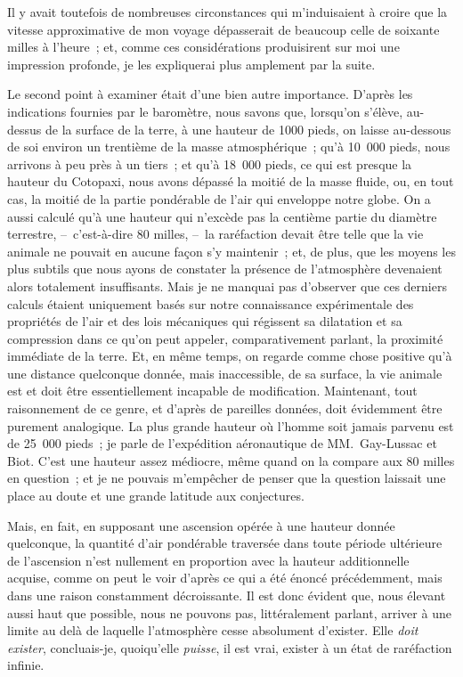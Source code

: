 \documentclass[french,twoside]{book} %
\begin{document}
Il y avait toutefois de nombreuses circonstances qui m’induisaient à croire que la vitesse approximative de mon voyage dépasserait de beaucoup celle de soixante milles à l’heure ; et, comme ces considérations produisirent sur moi une impression profonde, je les expliquerai plus amplement par la suite.\par
Le second point à examiner était d’une bien autre importance. D’après les indications fournies par le baromètre, nous savons que, lorsqu’on s’élève, au-dessus de la surface de la terre, à une hauteur de 1000 pieds, on laisse au-dessous de soi environ un trentième de la masse atmosphérique ; qu’à 10 000 pieds, nous arrivons à peu près à un tiers ; et qu’à 18 000 pieds, ce qui est presque la hauteur du Cotopaxi, nous avons dépassé la moitié de la masse fluide, ou, en tout cas, la moitié de la partie pondérable de l’air qui enveloppe notre globe. On a aussi calculé qu’à une hauteur qui n’excède pas la centième partie du diamètre terrestre, – c’est-à-dire 80 milles, – la raréfaction devait être telle que la vie animale ne pouvait en aucune façon s’y maintenir ; et, de plus, que les moyens les plus subtils que nous ayons de constater la présence de l’atmosphère devenaient alors totalement insuffisants. Mais je ne manquai pas d’observer que ces derniers calculs étaient uniquement basés sur notre connaissance expérimentale des propriétés de l’air et des lois mécaniques qui régissent sa dilatation et sa compression dans ce qu’on peut appeler, comparativement parlant, la proximité immédiate de la terre. Et, en même temps, on regarde comme chose positive qu’à une distance quelconque donnée, mais inaccessible, de sa surface, la vie animale est et doit être essentiellement incapable de modification. Maintenant, tout raisonnement de ce genre, et d’après de pareilles données, doit évidemment être purement analogique. La plus grande hauteur où l’homme soit jamais parvenu est de 25 000 pieds ; je parle de l’expédition aéronautique de MM. Gay-Lussac et Biot. C’est une hauteur assez médiocre, même quand on la compare aux 80 milles en question ; et je ne pouvais m’empêcher de penser que la question laissait une place au doute et une grande latitude aux conjectures.\par
Mais, en fait, en supposant une ascension opérée à une hauteur donnée quelconque, la quantité d’air pondérable traversée dans toute période ultérieure de l’ascension n’est nullement en proportion avec la hauteur additionnelle acquise, comme on peut le voir d’après ce qui a été énoncé précédemment, mais dans une raison constamment décroissante. Il est donc évident que, nous élevant aussi haut que possible, nous ne pouvons pas, littéralement parlant, arriver à une limite au delà de laquelle l’atmosphère cesse absolument d’exister. Elle \emph{doit exister}, concluais-je, quoiqu’elle \emph{puisse}, il est vrai, exister à un état de raréfaction infinie.\par
\end{document}
